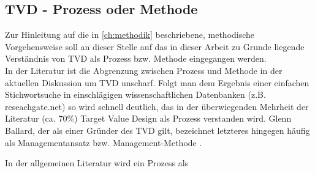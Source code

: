 
\subsection{TVD - Prozess oder Methode}
\label{sec: 2.3.1}

%
%
%
%
%
%

Zur Hinleitung auf die in \cref{ch:methodik} beschriebene, methodische Vorgehensweise soll an dieser Stelle auf das in dieser Arbeit zu Grunde liegende Verständnis von \ac{TVD} als Prozess bzw. Methode eingegangen werden.\\
In der Literatur ist die Abgrenzung zwischen Prozess und Methode in der aktuellen Diskussion um TVD unscharf. Folgt man dem Ergebnis einer einfachen Stichwortsuche in einschlägigen wissenschaftlichen Datenbanken (z.B. reseachgate.net) so wird schnell deutlich, das in der überwiegenden Mehrheit der Literatur (ca. 70\%) Target Value Design als Prozess verstanden wird.
Glenn Ballard, der als einer Gründer des \ac{TVD} gilt, bezeichnet letzteres hingegen häufig als Managementansatz bzw. Management-Methode \autocite[]{}.

In der allgemeinen Literatur wird ein Prozess als 